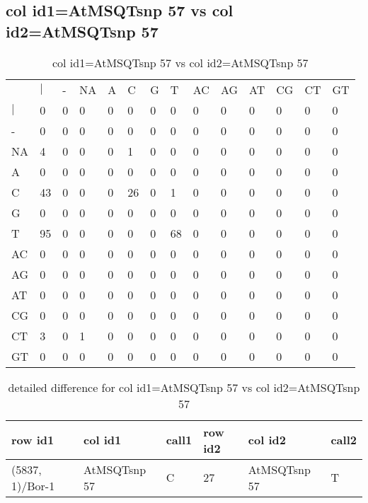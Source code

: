 \subsection{col id1=AtMSQTsnp 57 vs col id2=AtMSQTsnp 57}
\begin{center}
\begin{longtable}{|l|l|l|l|l|l|l|l|l|l|l|l|l|l|}
\caption{col id1=AtMSQTsnp 57 vs col id2=AtMSQTsnp 57} \label{table_dm744}\\
\hline
\\
\hline
&$|$&-&NA&A&C&G&T&AC&AG&AT&CG&CT&GT\\
$|$&0&0&0&0&0&0&0&0&0&0&0&0&0\\
-&0&0&0&0&0&0&0&0&0&0&0&0&0\\
NA&4&0&0&0&1&0&0&0&0&0&0&0&0\\
A&0&0&0&0&0&0&0&0&0&0&0&0&0\\
C&43&0&0&0&26&0&1&0&0&0&0&0&0\\
G&0&0&0&0&0&0&0&0&0&0&0&0&0\\
T&95&0&0&0&0&0&68&0&0&0&0&0&0\\
AC&0&0&0&0&0&0&0&0&0&0&0&0&0\\
AG&0&0&0&0&0&0&0&0&0&0&0&0&0\\
AT&0&0&0&0&0&0&0&0&0&0&0&0&0\\
CG&0&0&0&0&0&0&0&0&0&0&0&0&0\\
CT&3&0&1&0&0&0&0&0&0&0&0&0&0\\
GT&0&0&0&0&0&0&0&0&0&0&0&0&0\\
\hline
\end{longtable}
\end{center}

\begin{center}
\begin{longtable}{|l|l|l|l|l|l|}
\caption{detailed difference for col id1=AtMSQTsnp 57 vs col id2=AtMSQTsnp 57} \label{table_dm745}\\
\hline
row id1&col id1&call1&row id2&col id2&call2\\
\hline
(5837, 1)/Bor-1&AtMSQTsnp 57&C&27&AtMSQTsnp 57&T\\
\hline
\end{longtable}
\end{center}

